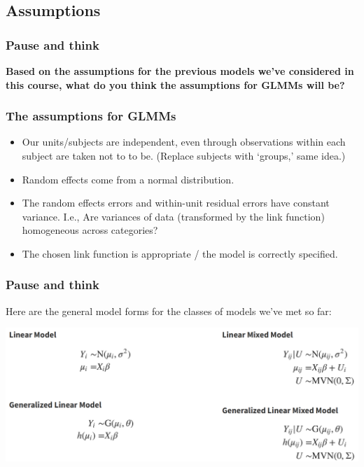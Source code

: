 \documentclass[
  openany]{book}
\begin{document}
\hypertarget{assumptions-5}{%
\subsection{Assumptions}\label{assumptions-5}}

\hypertarget{pause-and-think}{%
\subsubsection{Pause and think}\label{pause-and-think}}

\textbf{Based on the assumptions for the previous models we've considered in this course, what do you think the assumptions for GLMMs will be?}

\hypertarget{the-assumptions-for-glmms}{%
\subsubsection{The assumptions for GLMMs}\label{the-assumptions-for-glmms}}

\begin{itemize}
\item
  Our units/subjects are independent, even through observations within each subject are taken not to to be. (Replace subjects with `groups,' same idea.)
\item
  Random effects come from a normal distribution.
\item
  The random effects errors and within-unit residual errors have constant variance. I.e., Are variances of data (transformed by the link function) homogeneous across categories?
\item
  The chosen link function is appropriate / the model is correctly specified.
\end{itemize}

\hypertarget{pause-and-think-1}{%
\subsubsection{Pause and think}\label{pause-and-think-1}}

Here are the general model forms for the classes of models we've met so far:

\includegraphics[width=27.11in]{images/m5/mod-table}
\end{document}
